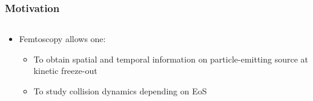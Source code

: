 \documentclass[dvipsnames] {beamer}
\begin{document}
      \begin{frame}
        \bf 
        \vskip -0.5cm
        \frametitle{\bf \centering Motivation}
                   {\footnotesize 
                     \begin{columns}[t]
                       \begin{block}{}
                         \begin{itemize}
                         \item {\color{red} Femtoscopy allows one:}
                           \begin{itemize}
                           \item {\footnotesize To obtain spatial and temporal information on particle-emitting source at kinetic freeze-out}
                           \item {\footnotesize To study collision dynamics depending on EoS}
                           \end{itemize}
                         \end{itemize}
                         

\end{block}
\end{columns}}
\end{frame}
\end{document}
